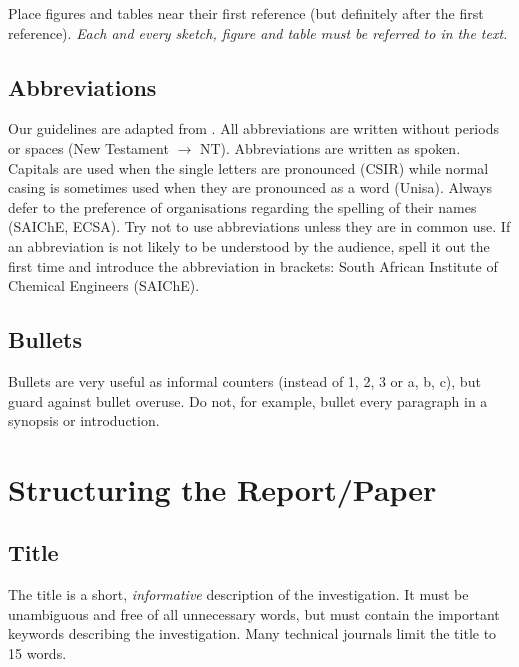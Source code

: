 \documentclass[a5paper, 10pt]{article}
\begin{document}
Place figures and tables near their first reference (but definitely
after the first reference).  \emph{Each and every sketch, figure and
  table must be referred to in the text.}

\subsection{Abbreviations}
\label{sec:abbreviations}
Our guidelines are adapted from \citet[17]{burger}.  All abbreviations
are written without periods or spaces (New Testament $\rightarrow$
NT).  Abbreviations are written as spoken. Capitals are used when the
single letters are pronounced (CSIR) while normal casing is sometimes used
when they are pronounced as a word (Unisa).  Always defer to the
preference of organisations regarding the spelling of their names
(SAIChE, ECSA).  Try not to use abbreviations unless they are in
common use.  If an abbreviation is not likely to be understood by the
audience, spell it out the first time and introduce the abbreviation
in brackets: South African Institute of Chemical Engineers (SAIChE).

\subsection{Bullets}
\label{sec:bullets}
Bullets are very useful as informal counters (instead of 1, 2, 3 or a, b, c), but guard against bullet overuse.
Do not, for example, bullet every paragraph in a synopsis or introduction.

\section{Structuring the Report/Paper}
\label{cha:structure}

\subsection{Title}
\label{sec:title}
The title is a short, \emph{informative} description of the
investigation.  It must be unambiguous and free of all unnecessary
words, but must contain the important keywords describing the
investigation. Many technical journals limit the title to 15 words.
\end{document}
